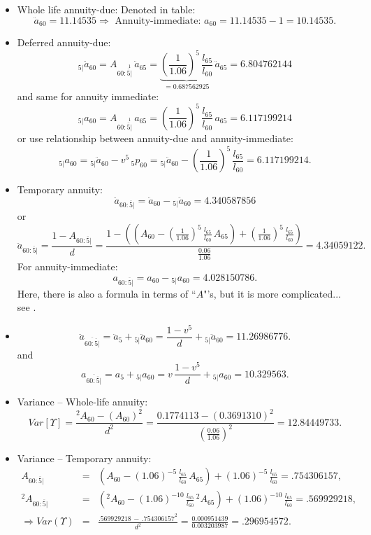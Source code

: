 \documentclass[11pt,fleqn,oneside]{book}
\begin{document}
\begin{enumerate}
\begin{itemize}
\item Whole life annuity-due: Denoted in table: 
$$
\ddot{a}_{60} = 11.14535 \Longrightarrow \text{ Annuity-immediate: } a_{60} = 11.14535 - 1 = 10.14535.
$$
\item Deferred annuity-due:
$$
{_{5|}\ddot{a}_{60}} = A_{60:\stackrel{1}{\overline{5}|}}\,\ddot{a}_{65} = \underbrace{\left(\frac{1}{1.06}\right)^5\,\frac{l_{65}}{l_{60}}}_{=0.687562925}\,\ddot{a}_{65} = 6.804762144
$$
and same for annuity immediate:
$$
{_{5|}a_{60}} = A_{60:\stackrel{1}{\overline{5}|}}\,a_{65} = \left(\frac{1}{1.06}\right)^5\,\frac{l_{65}}{l_{60}}\,a_{65} = 6.117199214
$$
or use relationship between annuity-due and annuity-immediate:
$$
{_{5|}a_{60}} = {_{5|}\ddot{a}_{60}} - v^5\,{_5p_{60}} = {_{5|}\ddot{a}_{60}} - \left(\frac{1}{1.06}\right)^5\,\frac{l_{65}}{l_{60}} = 6.117199214.
$$
\item Temporary annuity:
$$
\ddot{a}_{60:\overline{5}|} = \ddot{a}_{60} - {_{5|}\ddot{a}_{60}} = 4.340587856
$$
or
$$
\ddot{a}_{60:\overline{5}|} = \frac{1-A_{60:\overline{5}|}}{d} = \frac{1 - \left(\left(A_{60} - \left(\frac{1}{1.06}\right)^5\,\frac{l_{65}}{l_{60}}\,A_{65}\right) + \left(\frac{1}{1.06}\right)^5\,\frac{l_{65}}{l_{60}} \right)}{\frac{0.06}{1.06}} = 4.34059122.
$$
For annuity-immediate:
$$
a_{60:\overline{5}|} = a_{60} - {_{5|}a_{60}} = 4.028150786.
$$
Here, there is also a formula in terms of ``$A$"'s, but it is more complicated... see \cite{BOWERS}.
\item 
$$
\ddot{a}_{\overline{60:\overline{5}|}} = \ddot{a}_{5} + {_{5|}\ddot{a}_{60}} = \frac{1-v^5}{d} + {_{5|}\ddot{a}_{60}} = 11.26986776.
$$
and 
$$
a_{\overline{60:\overline{5}|}} = a_{5} + {_{5|}a_{60}} = v\,\frac{1-v^5}{d} + {_{5|}a_{60}} = 10.329563.
$$
\item
Variance -- Whole-life annuity:
$$
Var[\Upsilon] = \frac{{^2A_{60}} - \left(A_{60}\right)^2}{d^2} = \frac{0.1774113 - (0.3691310)^2}{\left(\frac{0.06}{1.06}\right)^2} = 12.84449733.
$$
\item
Variance -- Temporary annuity:
\begin{eqnarray*}
A_{60:\overline{5}|} &=& \left(A_{60} - (1.06)^{-5}\,\frac{l_{65}}{l_{60}}\,A_{65}\right) + (1.06)^{-5}\,\frac{l_{65}}{l_{60}} = .754306157,\\
{^2A_{60:\overline{5}|}} &=& \left({^2A_{60}} - (1.06)^{-10}\,\frac{l_{65}}{l_{60}}\,{^2A_{65}}\right) + (1.06)^{-10}\,\frac{l_{65}}{l_{60}} = .569929218,\\
\Rightarrow Var(\Upsilon) &=& \frac{.569929218 \,-\, .754306157^2}{d^2} = \frac{0.000951439}{0.003203987}=.296954572.

\end{eqnarray*}
\end{itemize}
\end{enumerate}
\end{document}
